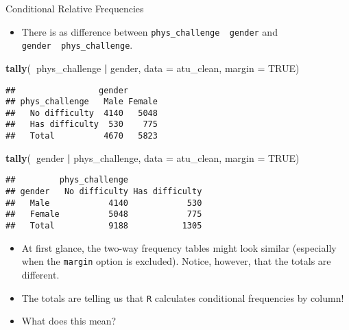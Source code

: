 \documentclass[
  ignorenonframetext,
]{beamer}
\newenvironment{Shaded}{\begin{snugshade}}{\end{snugshade}}
\newcommand{\DataTypeTok}[1]{\textcolor[rgb]{0.13,0.29,0.53}{#1}}
\newcommand{\KeywordTok}[1]{\textcolor[rgb]{0.13,0.29,0.53}{\textbf{#1}}}
\newcommand{\NormalTok}[1]{#1}
\newcommand{\OperatorTok}[1]{\textcolor[rgb]{0.81,0.36,0.00}{\textbf{#1}}}
\newcommand{\OtherTok}[1]{\textcolor[rgb]{0.56,0.35,0.01}{#1}}
\newcommand{\StringTok}[1]{\textcolor[rgb]{0.31,0.60,0.02}{#1}}
\providecommand{\tightlist}{%
  \setlength{\itemsep}{0pt}\setlength{\parskip}{0pt}}
\begin{document}
\begin{frame}[fragile]{Conditional Relative Frequencies}
\protect\hypertarget{conditional-relative-frequencies}{}

\begin{itemize}
\tightlist
\item
  There is as difference between
  \texttt{phys\_challenge\ \textbar{}\ gender} and
  \texttt{gender\ \textbar{}\ phys\_challenge}.
\end{itemize}

\begin{Shaded}
\begin{Highlighting}[]
\KeywordTok{tally}\NormalTok{(}\OperatorTok{~}\NormalTok{phys_challenge }\OperatorTok{|}\StringTok{ }\NormalTok{gender, }\DataTypeTok{data =}\NormalTok{ atu_clean, }\DataTypeTok{margin =} \OtherTok{TRUE}\NormalTok{)}
\end{Highlighting}
\end{Shaded}

\begin{verbatim}
##                 gender
## phys_challenge   Male Female
##   No difficulty  4140   5048
##   Has difficulty  530    775
##   Total          4670   5823
\end{verbatim}

\begin{Shaded}
\begin{Highlighting}[]
\KeywordTok{tally}\NormalTok{(}\OperatorTok{~}\NormalTok{gender }\OperatorTok{|}\StringTok{ }\NormalTok{phys_challenge, }\DataTypeTok{data =}\NormalTok{ atu_clean, }\DataTypeTok{margin =} \OtherTok{TRUE}\NormalTok{)}
\end{Highlighting}
\end{Shaded}

\begin{verbatim}
##         phys_challenge
## gender   No difficulty Has difficulty
##   Male            4140            530
##   Female          5048            775
##   Total           9188           1305
\end{verbatim}

\begin{itemize}
\item
  At first glance, the two-way frequency tables might look similar
  (especially when the \texttt{margin} option is excluded). Notice,
  however, that the totals are different.
\item
  The totals are telling us that \texttt{R} calculates conditional
  frequencies by column!
\item
  What does this mean?


\end{itemize}
\end{frame}
\end{document}
